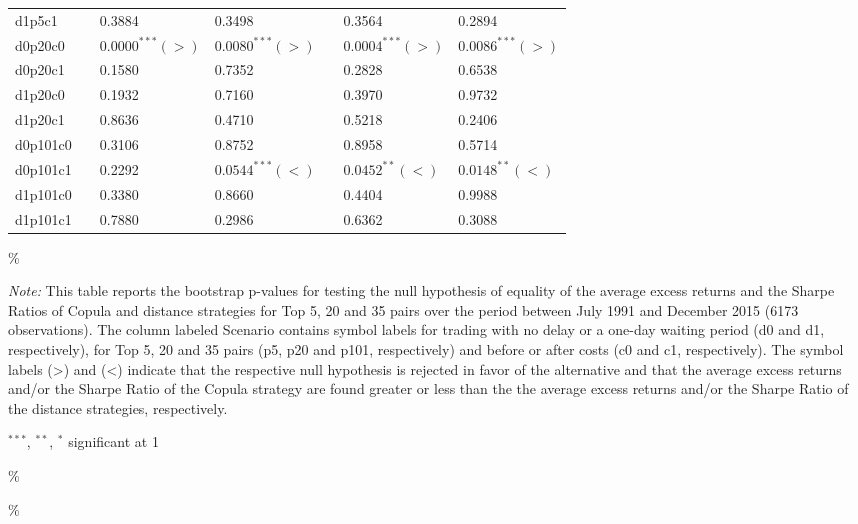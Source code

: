 \documentclass[a4paper]{article}
\begin{document}
\begin{threeparttable}[H]
\begin{tabularx}{\textwidth}{@{\extracolsep{\fill}}lllllll@{}}
			d1p5c1 & & 0.3884 & 0.3498 &       & 0.3564 & 0.2894 \\
			d0p20c0 & & $0.0000^{***}(>)$ & $0.0080^{***}(>)$ &       & $0.0004^{***}(>)$ & $0.0086^{***}(>)$ \\
			d0p20c1 & & 0.1580 & 0.7352 &       & 0.2828 & 0.6538 \\
			d1p20c0 & & 0.1932 & 0.7160 &       & 0.3970 & 0.9732 \\
			d1p20c1 & & 0.8636 & 0.4710 &       & 0.5218 & 0.2406 \\
			d0p101c0 & & 0.3106 & 0.8752 &       & 0.8958 & 0.5714 \\
			d0p101c1 & & 0.2292 & $0.0544^{***}(<)$ &       & $0.0452^{**}(<)$ & $0.0148^{**}(<)$ \\
			d1p101c0 & & 0.3380 & 0.8660 &       & 0.4404 & 0.9988 \\
			d1p101c1 & & 0.7880 & 0.2986 &       & 0.6362 & 0.3088 \\
			\bottomrule
		\end{tabularx}\%
		\begin{tablenotes}
			\item \textit{Note:} \scriptsize This table reports the bootstrap p-values for testing the null hypothesis of equality of the average excess returns and the Sharpe Ratios of Copula and distance strategies for Top 5, 20 and 35 pairs over the period between July 1991 and December 2015 (6173 observations). The column labeled Scenario contains symbol labels for trading with no delay or a one-day waiting period (d0 and d1, respectively), for Top 5, 20 and 35 pairs (p5, p20 and p101, respectively) and before or after costs (c0 and c1, respectively). The symbol labels (>) and (<) indicate that the respective null hypothesis is rejected in favor of the alternative and that the average excess returns and/or the Sharpe Ratio of the Copula strategy are found greater or less than the the average excess returns and/or the Sharpe Ratio of the distance strategies, respectively.
			\item \scriptsize $^{\ast\ast\ast}$, $^{\ast\ast}$, $^{\ast}$  significant at 1\\%
		\end{tablenotes}
		\label{tab:table120}\%
	\end{threeparttable}\%
	
	\medskip
	
	
	\vspace{1.0cm}
	
\end{document}
